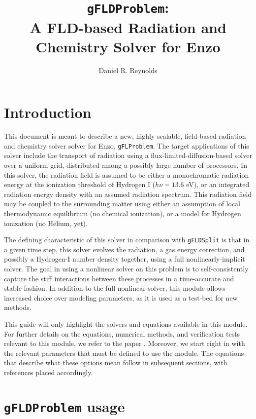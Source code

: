 \documentclass[letterpaper,10pt]{article}
\author{Daniel R. Reynolds}
\title{{\tt gFLDProblem}: \\
A FLD-based Radiation and Chemistry Solver for Enzo}
\renewcommand{\(}{\left(}
\renewcommand{\)}{\right)}
\begin{document}
\maketitle

\section{Introduction}
\label{sec:intro}

This document is meant to describe a new, highly scalable,
field-based radiation and chemistry solver solver for Enzo, 
{\tt gFLProblem}. The target applications of this solver include the
transport of radiation using a flux-limited-diffusion-based solver
over a uniform grid, distributed among a possibly large number of
processors.  In this solver, the radiation field is assumed to be
either a monochromatic radiation energy at the ionization threshold of
Hydrogen I ($h\nu = 13.6$ eV), or an integrated radiation energy
density with an assumed radiation spectrum.  This radiation field may
be coupled to the surrounding matter using either an assumption of
local thermodynamic equilibrium (no chemical ionization), or a model
for Hydrogen ionization (no Helium, yet). 

The defining characteristic of this solver in comparison 
with {\tt gFLDSplit} is that in a given time step, this
solver evolves the radiation, a gas energy correction, and possibly a
Hydrogen-I number density together, using a full nonlinearly-implicit
solver.  The goal in using a nonlinear solver on this problem is
to self-consistently capture the stiff interactions between these
processes in a time-accurate and stable fashion.  In addition to the
full nonlinear solver, this module allows increased choice over
modeling parameters, as it is used as a test-bed for new methods.

This guide will only highlight the solvers and equations available in
this module.  For further details on the equations, numerical methods,
and verification tests relevant to this module, we refer to the paper 
\cite{ReynoldsHayesPaschosNorman2009}.  Moreover, we start right in
with the relevant parameters that must be defined to use the module.
The equations that describe what these options mean follow in
subsequent sections, with references placed accordingly.




\section{{\tt gFLDProblem} usage}
\label{sec:module_usage}
\end{document}
